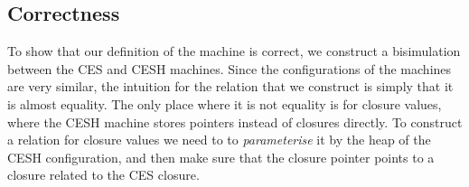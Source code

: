 \documentclass{article}
\theoremstyle{definition}
\newcommand{\Conid}[1]{\mathit{#1}}
\newcommand{\Varid}[1]{\mathit{#1}}
\def\resethooks{\global\let\SaveRestoreHook\empty
  \global\let\ColumnHook\empty}
\newlength{\blanklineskip}
\let\hspost\empty
\renewcommand\Varid[1]{\mathord{\textsf{#1}}}
\let\Conid\Varid
\newcommand\Keyword[1]{\textsf{\textbf{#1}}}
\renewcommand\Keyword[1]{\textsf{\underline{#1}}}
\renewcommand\Varid[1]{\textsf{#1}}
\begin{document}
\begin{comment}
\begin{hscode}\SaveRestoreHook
\column{B}{@{}>{\hspre}l<{\hspost}@{}}\column{3}{@{}>{\hspre}l<{\hspost}@{}}\column{E}{@{}>{\hspre}l<{\hspost}@{}}\>[3]{}\Varid{h⊆h▸x}\;[\mskip1.5mu \mskip1.5mu]\;\Varid{ptr}\;(){}\<[E]\\
\>[3]{}\Varid{h⊆h▸x}\;(\Varid{x}\;\Varid{∷}\;\Varid{h})\;\Varid{zero}\;\Varid{eq}\;\mathrel{=}\;\Varid{eq}{}\<[E]\\
\>[3]{}\Varid{h⊆h▸x}\;(\Varid{x}\;\Varid{∷}\;\Varid{h})\;(1+\;\Varid{ptr})\;\Varid{eq}\;\mathrel{=}\;\Varid{h⊆h▸x}\;\Varid{h}\;\Varid{ptr}\;\Varid{eq}{}\<[E]\ColumnHook
\end{hscode}\resethooks
\end{comment}
\fi
\subsection{Correctness} \label{section:CESH-bisim}
To show that our definition of the machine is correct, we construct
a bisimulation between the CES and CESH machines.
Since the configurations of the machines are very similar, the
intuition for the relation that we construct is simply that it is
almost equality. The only place where it is not equality is for
closure values, where the CESH machine stores pointers instead of
closures directly.  To construct a relation for closure values we need
to to \emph{parameterise} it by the heap of the CESH configuration,
and then make sure that the closure pointer points to a closure
related to the CES closure.

\begin{comment}
\begin{hscode}\SaveRestoreHook
\column{B}{@{}>{\hspre}l<{\hspost}@{}}\column{29}{@{}>{\hspre}l<{\hspost}@{}}\column{E}{@{}>{\hspre}l<{\hspost}@{}}\>[B]{}\Keyword{module}\;\Conid{CESH.Simulation}\;(\Conid{Node}\;\mathbin{:}\;\star)\;\Keyword{where}{}\<[E]\\[\blanklineskip]\>[B]{}\Keyword{open}\;\Keyword{import}\;\Conid{GeneralLemmas}{}\<[E]\\
\>[B]{}\Keyword{open}\;\Keyword{import}\;\Conid{CES}\;{}\<[29]\>[29]{}\Conid{Node}\;\Varid{as}\;\Conid{CES}{}\<[E]\\
\>[B]{}\Keyword{open}\;\Keyword{import}\;\Conid{CESH}\;{}\<[29]\>[29]{}\Conid{Node}\;\Varid{as}\;\Conid{CESH}{}\<[E]\\
\>[B]{}\Keyword{open}\;\Keyword{import}\;\Conid{CESH.Properties}\;\Conid{Node}{}\<[E]\\
\>[B]{}\Keyword{open}\;\Keyword{import}\;\Conid{Heap}{}\<[E]\\
\>[B]{}\Keyword{open}\;\Keyword{import}\;\Conid{MachineCode}\;\Conid{Node}{}\<[E]\\
\>[B]{}\Keyword{open}\;\Keyword{import}\;\Conid{Relation}{}\<[E]\ColumnHook
\end{hscode}\resethooks
\end{comment}
\end{document}
